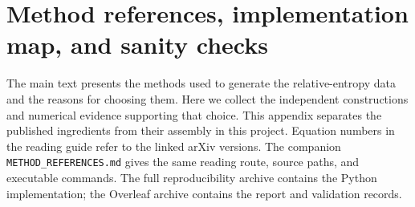 \clearpage
\section{Method references, implementation map, and sanity checks}
\label{sec:method-audit}
The main text presents the methods used to generate the relative-entropy
data and the reasons for choosing them. Here we collect the independent
constructions and numerical evidence supporting that choice.
This appendix separates the published ingredients from their assembly
in this project. Equation numbers in the reading guide refer to the
linked arXiv versions. The companion \texttt{METHOD\_REFERENCES.md}
gives the same reading route, source paths, and executable commands.
The full reproducibility archive contains the Python implementation;
the Overleaf archive contains the report and validation records.



\clearpage


\clearpage

